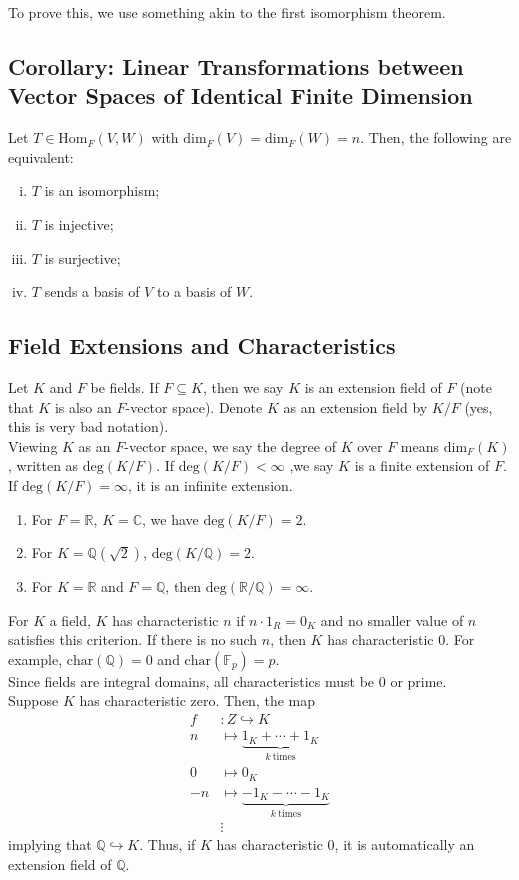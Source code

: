 \documentclass[8pt]{extarticle}
\newcommand{\Q}{\mathbb{Q}}
\newcommand{\R}{\mathbb{R}}
\begin{document}
  To prove this, we use something akin to the first isomorphism theorem.
  \subsection{Corollary: Linear Transformations between Vector Spaces of Identical Finite Dimension}%
  Let $T\in \text{Hom}_F(V,W)$ with $\text{dim}_F(V) = \text{dim}_F(W) = n$. Then, the following are equivalent:
  \begin{enumerate}[(i)]
    \item $T$ is an isomorphism;
    \item $T$ is injective;
    \item $T$ is surjective;
    \item $T$ sends a basis of $V$ to a basis of $W$.
  \end{enumerate}
  \subsection{Field Extensions and Characteristics}%
  Let $K$ and $F$ be fields. If $F\subseteq K$, then we say $K$ is an extension field of $F$ (note that $K$ is also an $F$-vector space). Denote $K$ as an extension field by $K/F$ (yes, this is very bad notation).\\

  Viewing $K$ as an $F$-vector space, we say the degree of $K$ over $F$ means $\text{dim}_F(K)$, written as $\text{deg}(K/F)$. If $\text{deg}(K/F) < \infty$ ,we say $K$ is a finite extension of $F$. If $\text{deg}(K/F) = \infty$, it is an infinite extension.
  \begin{enumerate}[(1)]
    \item For $F = \R$, $K = \mathbb{C}$, we have $\text{deg}(K/F) = 2$.
    \item For $K = \Q(\sqrt{2})$, $\text{deg}(K/\Q) = 2$.
    \item For $K = \R$ and $F = \Q$, then $\text{deg}(\R/\Q) = \infty$.
  \end{enumerate}
  For $K$ a field, $K$ has characteristic $n$ if $n\cdot 1_R = 0_K$ and no smaller value of $n$ satisfies this criterion. If there is no such $n$, then $K$ has characteristic $0$. For example, $\text{char}(\Q) = 0$ and $\text{char}(\mathbb{F}_p) = p$.\\

  Since fields are integral domains, all characteristics must be $0$ or prime.\\

  Suppose $K$ has characteristic zero. Then, the map
  \begin{align*}
    f&: Z\hookrightarrow K\\
    n&\mapsto \underbrace{1_K + \cdots + 1_K}_{k~\text{times}}\\
    0 &\mapsto 0_K\\
    -n &\mapsto \underbrace{-1_K - \cdots - 1_K}_{k~\text{times}}\\
       &\vdots
  \end{align*}
  implying that $\Q\hookrightarrow K$. Thus, if $K$ has characteristic $0$, it is automatically an extension field of $\Q$.\\
\end{document}
